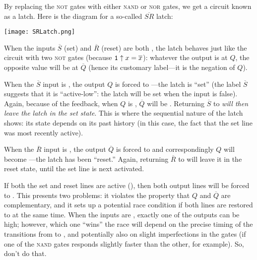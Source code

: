 By replacing the \textsc{not} gates with either \textsc{nand} or \textsc{nor} gates, we get a circuit known as a latch. Here is the diagram for a so-called $\overline{SR}$ latch:
\begin{center}
\texttt{[image: SRLatch.png]}
\end{center}
When the inputs $\overline{S}$ (set) and $\overline{R}$ (reset) are both \1, the latch behaves just like the circuit with two \textsc{not} gates (because $\mathtt{1}\uparrow x=\overline{x}$): whatever the output is at $Q$, the opposite value will be at $\overline{Q}$ (hence its customary label---it is the negation of $Q$).

When the $\overline{S}$ input is \0, the output $Q$ is forced to \1---the latch is ``set'' (the label $\overline{S}$ suggests that it is ``active-low'': the latch will be set when the input is false). Again, because of the feedback, when $Q$ is \1, $\overline{Q}$ will be \0. Returning $\overline{S}$ to \1 \emph{will then leave the latch in the set state}. This is where the sequential nature of the latch shows: its state depends on its past history (in this case, the fact that the set line was most recently active).

When the $\overline{R}$ input is \0, the output $\overline{Q}$ is forced to \1 and correspondingly $Q$ will become \0---the latch has been ``reset.'' Again, returning $\overline{R}$ to \1 will leave it in the reset state, until the set line is next activated.

If both the set and reset lines are active (\0), then both output lines will be forced to \1. This presents two problems: it violates the property that $Q$ and $\overline{Q}$ are complementary, and it sets up a potential race condition if both lines are restored to \1 at the same time. When the inputs are \1, exactly one of the outputs can be high; however, which one ``wins'' the race will depend on the precise timing of the transitions from \0 to \1, and potentially also on slight imperfections in the gates (if one of the \textsc{nand} gates responds slightly faster than the other, for example). So, don't do that.

